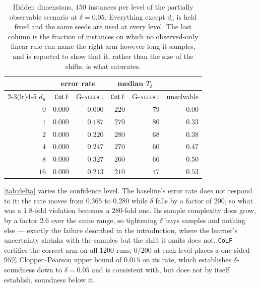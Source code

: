 \begin{table}[t]
  \centering
  \caption{Hidden dimensions, $150$ instances per level of the partially
  observable scenario at $\delta=0.05$.  Everything except $d_u$ is held fixed
  and the same seeds are used at every level.  The last column is the fraction
  of instances on which no observed-only linear rule can name the right arm
  however long it samples, and is reported to show that it, rather than the
  size of the shifts, is what saturates.}
  \label{tab:du}
  \small
  \begin{tabular}{rrrrrr}
    \toprule
    & \multicolumn{2}{c}{error rate} & \multicolumn{2}{c}{median $T_\delta$} & \\
    \cmidrule(lr){2-3}\cmidrule(lr){4-5}
    $d_u$ & \texttt{CoLF} & \textsc{G-alloc.} & \texttt{CoLF} & \textsc{G-alloc.}
      & unsolvable\\
    \midrule
    $0$  & $0.000$ & $0.000$ & $220$ & $79$ & $0.00$\\
    $1$  & $0.000$ & $0.187$ & $270$ & $80$ & $0.33$\\
    $2$  & $0.000$ & $0.220$ & $280$ & $68$ & $0.38$\\
    $4$  & $0.000$ & $0.247$ & $270$ & $60$ & $0.47$\\
    $8$  & $0.000$ & $0.327$ & $260$ & $66$ & $0.50$\\
    $16$ & $0.000$ & $0.213$ & $210$ & $47$ & $0.53$\\
    \bottomrule
  \end{tabular}
\end{table}

\cref{tab:delta} varies the confidence level.  The baseline's error rate does
not respond to it: the rate moves from $0.365$ to $0.280$ while $\delta$ falls
by a factor of $200$, so what was a $1.8$-fold violation becomes a $280$-fold
one.  Its sample complexity does grow, by a factor $2.6$ over the same range,
so tightening $\delta$ buys samples and nothing else --- exactly the failure
described in the introduction, where the learner's uncertainty shrinks with the
samples but the shift it omits does not.  \texttt{CoLF} certifies the correct
arm on all $1200$ runs; $0/200$ at each level places a one-sided $95\%$
Clopper--Pearson upper bound of $0.015$ on its rate, which establishes
$\delta$-soundness down to $\delta=0.05$ and is consistent with, but does not
by itself establish, soundness below it.

